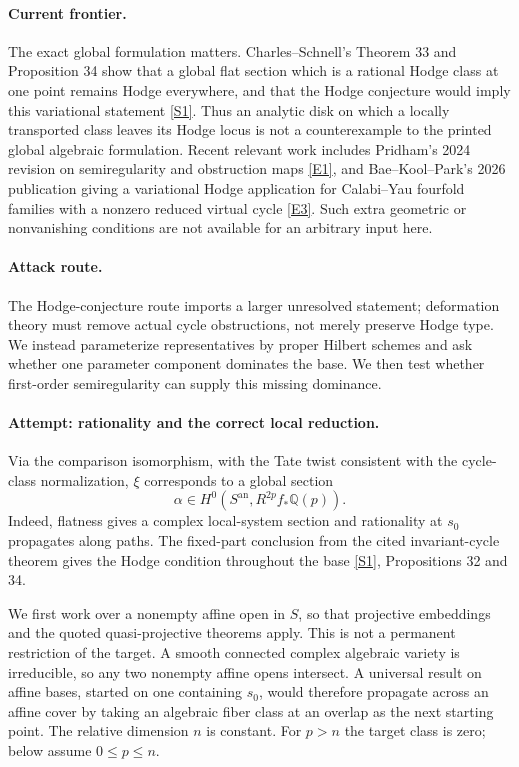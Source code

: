 \documentclass[11pt,a4paper]{article}
\newcommand{\Q}{\mathbb{Q}}
\newcommand{\sref}[2]{\hyperlink{source:#1:#2}{[S#2]}}
\newcommand{\eref}[2]{\hyperlink{extra:#1:#2}{[E#2]}}
\numberwithin{equation}{section}
\begin{document}
\paragraph{Current frontier.}
The exact global formulation matters. Charles--Schnell's Theorem 33 and
Proposition 34 show that a global flat section which is a rational Hodge
class at one point remains Hodge everywhere, and that the Hodge conjecture
would imply this variational statement \sref{30006758}{1}. Thus an analytic
disk on which a locally transported class leaves its Hodge locus is not a
counterexample to the printed global algebraic formulation. Recent relevant
work includes Pridham's 2024 revision on semiregularity and obstruction
maps \eref{30006758}{1}, and Bae--Kool--Park's 2026 publication giving a
variational Hodge application for Calabi--Yau fourfold families with a
nonzero reduced virtual cycle \eref{30006758}{3}. Such extra geometric or
nonvanishing conditions are not available for an arbitrary input here.

\paragraph{Attack route.}
The Hodge-conjecture route imports a larger unresolved statement; deformation
theory must remove actual cycle obstructions, not merely preserve Hodge type.
We instead parameterize representatives by proper Hilbert schemes and ask
whether one parameter component dominates the base. We then test whether
first-order semiregularity can supply this missing dominance.

\paragraph{Attempt: rationality and the correct local reduction.}
Via the comparison isomorphism, with the Tate twist consistent with the
cycle-class normalization, $\xi$ corresponds to a global section
\[
 \alpha\in H^0(S^{\mathrm{an}},R^{2p}f_*\Q(p)).
\]
Indeed, flatness gives a complex local-system section and rationality at
$s_0$ propagates along paths. The fixed-part conclusion from the cited
invariant-cycle theorem gives the Hodge condition throughout the base
\sref{30006758}{1}, Propositions 32 and 34.

We first work over a nonempty affine open in $S$, so that projective
embeddings and the quoted quasi-projective theorems apply. This is not a
permanent restriction of the target. A smooth connected complex algebraic
variety is irreducible, so any two nonempty affine opens intersect. A
universal result on affine bases, started on one containing $s_0$, would
therefore propagate across an affine cover by taking an algebraic fiber
class at an overlap as the next starting point. The relative dimension
$n$ is constant. For $p>n$ the target class is zero; below assume
$0\le p\le n$.
\end{document}

